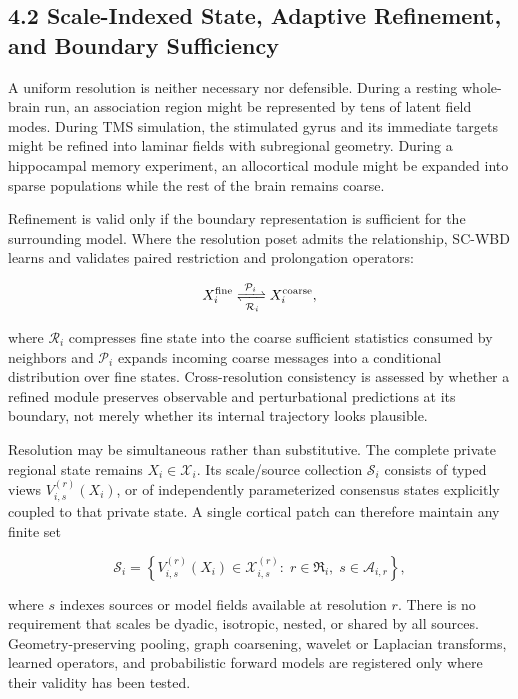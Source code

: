 \subsection{4.2 Scale-Indexed State, Adaptive Refinement, and Boundary Sufficiency}

A uniform resolution is neither necessary nor defensible. During a resting
whole-brain run, an association region might be represented by tens of latent
field modes. During TMS simulation, the stimulated gyrus and its immediate
targets might be refined into laminar fields with subregional geometry.
During a hippocampal memory experiment, an allocortical module might be
expanded into sparse populations while the rest of the brain remains coarse.

Refinement is valid only if the boundary representation is sufficient for the
surrounding model. Where the resolution poset admits the relationship, SC-WBD
learns and validates paired restriction and prolongation operators:

\[
X_i^{\mathrm{fine}}
\xrightleftharpoons[\;\mathcal{R}_i\;]{\;\mathcal{P}_i\;}
X_i^{\mathrm{coarse}},
\]

where \(\mathcal{R}_i\) compresses fine state into the coarse sufficient
statistics consumed by neighbors and \(\mathcal{P}_i\) expands incoming coarse
messages into a conditional distribution over fine states. Cross-resolution
consistency is assessed by whether a refined module preserves observable and
perturbational predictions at its boundary, not merely whether its internal
trajectory looks plausible.

Resolution may be simultaneous rather than substitutive. The complete private
regional state remains \(X_i\in\mathcal X_i\). Its scale/source collection
\(\mathcal S_i\) consists of typed views \(V_{i,s}^{(r)}(X_i)\), or of
independently parameterized consensus states explicitly coupled to that private
state. A single cortical patch can therefore maintain any finite set

\[
\mathcal{S}_i=
\left\{
V_{i,s}^{(r)}(X_i)\in\mathcal{X}_{i,s}^{(r)}
:\; r\in\mathfrak{R}_i,\;s\in\mathcal{A}_{i,r}
\right\},
\]

where \(s\) indexes sources or model fields available at resolution \(r\).
There is no requirement that scales be dyadic, isotropic, nested, or shared by
all sources. Geometry-preserving pooling, graph coarsening, wavelet or
Laplacian transforms, learned operators, and probabilistic forward models are
registered only where their validity has been tested.

